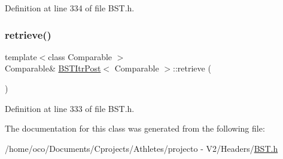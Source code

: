Definition at line 334 of file B\+S\+T.\+h.

\hypertarget{class_b_s_t_itr_post_a72446e4d0df0bcafc14294a78faeb56e}{}\label{class_b_s_t_itr_post_a72446e4d0df0bcafc14294a78faeb56e} 
\subsubsection{\texorpdfstring{retrieve()}{retrieve()}}
{\footnotesize\ttfamily template$<$class Comparable $>$ \\
Comparable\& \hyperlink{class_b_s_t_itr_post}{B\+S\+T\+Itr\+Post}$<$ Comparable $>$\+::retrieve (\begin{DoxyParamCaption}{ }\end{DoxyParamCaption})\hspace{0.3cm}{\ttfamily [inline]}}



Definition at line 333 of file B\+S\+T.\+h.



The documentation for this class was generated from the following file\+:\begin{DoxyCompactItemize}
\item 
/home/oco/\+Documents/\+Cprojects/\+Athletes/projecto -\/ V2/\+Headers/\hyperlink{_b_s_t_8h}{B\+S\+T.\+h}\end{DoxyCompactItemize}
